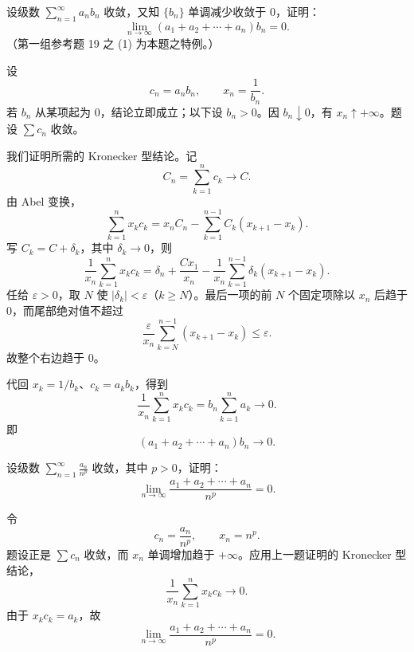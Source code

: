\begin{xreferenceproblem}[16]
设级数 $\sum_{n=1}^{\infty}a_nb_n$ 收敛，又知 $\{b_n\}$ 单调减少收敛于 0，证明：
\[
\lim_{n\to\infty}(a_1+a_2+\cdots+a_n)b_n=0.
\]
（第一组参考题 19 之 (1) 为本题之特例。）
\end{xreferenceproblem}
\begin{xsolution}
设
\[
 c_n=a_nb_n,
 \qquad
 x_n=\frac1{b_n}.
\]
若 $b_n$ 从某项起为 $0$，结论立即成立；以下设 $b_n>0$。因 $b_n\downarrow0$，有 $x_n\uparrow+\infty$。题设 $\sum c_n$ 收敛。

我们证明所需的 Kronecker 型结论。记
\[
 C_n=\sum_{k=1}^{n}c_k\longrightarrow C.
\]
由 Abel 变换，
\[
 \sum_{k=1}^{n}x_kc_k
 =x_nC_n-\sum_{k=1}^{n-1}C_k(x_{k+1}-x_k).
\]
写 $C_k=C+\delta_k$，其中 $\delta_k\to0$，则
\[
 \frac1{x_n}\sum_{k=1}^{n}x_kc_k
 =\delta_n+\frac{Cx_1}{x_n}
 -\frac1{x_n}\sum_{k=1}^{n-1}\delta_k(x_{k+1}-x_k).
\]
任给 $\varepsilon>0$，取 $N$ 使 $|\delta_k|<\varepsilon$（$k\geq N$）。最后一项的前 $N$ 个固定项除以 $x_n$ 后趋于 $0$，而尾部绝对值不超过
\[
 \frac{\varepsilon}{x_n}\sum_{k=N}^{n-1}(x_{k+1}-x_k)\leq\varepsilon.
\]
故整个右边趋于 $0$。

代回 $x_k=1/b_k$、$c_k=a_kb_k$，得到
\[
 \frac1{x_n}\sum_{k=1}^{n}x_kc_k
 =b_n\sum_{k=1}^{n}a_k\longrightarrow0.
\]
即
\[
 \boxed{(a_1+a_2+\cdots+a_n)b_n\to0}.
\]
\end{xsolution}


\begin{xreferenceproblem}[17]
设级数 $\sum_{n=1}^{\infty}\frac{a_n}{n^p}$ 收敛，其中 $p>0$，证明：
\[
\lim_{n\to\infty}\frac{a_1+a_2+\cdots+a_n}{n^p}=0.
\]
\end{xreferenceproblem}
\begin{xsolution}
令
\[
 c_n=\frac{a_n}{n^p},
 \qquad
 x_n=n^p.
\]
题设正是 $\sum c_n$ 收敛，而 $x_n$ 单调增加趋于 $+\infty$。应用上一题证明的 Kronecker 型结论，
\[
 \frac1{x_n}\sum_{k=1}^{n}x_kc_k\longrightarrow0.
\]
由于 $x_kc_k=a_k$，故
\[
 \boxed{\lim_{n\to\infty}\frac{a_1+a_2+\cdots+a_n}{n^p}=0}.
\]
\end{xsolution}


